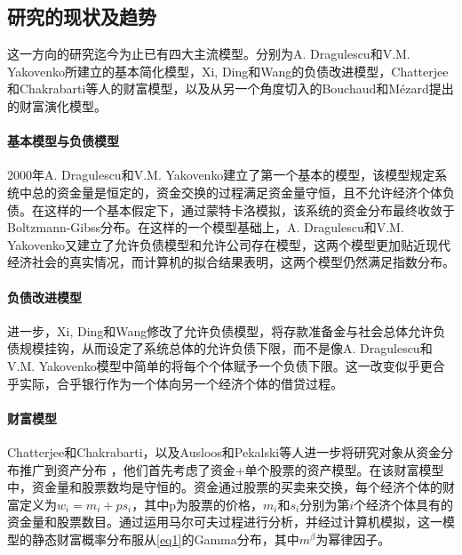 \documentclass[tsinghuacite]{HustGraduPaper}
\begin{document}
		
		\subsection{研究的现状及趋势}

			这一方向的研究迄今为止已有四大主流模型。分别为A. Dragulescu和V.M. Yakovenko所建立的基本简化模型，Xi, Ding和Wang的负债改进模型，Chatterjee和Chakrabarti等人的财富模型，以及从另一个角度切入的Bouchaud和Mézard提出的财富演化模型。
	
			\paragraph{基本模型与负债模型}
			
			2000年A. Dragulescu和V.M. Yakovenko建立了第一个基本的模型，该模型规定系统中总的资金量是恒定的，资金交换的过程满足资金量守恒，且不允许经济个体负债\cite{dragulescu2000statistical}。在这样的一个基本假定下，通过蒙特卡洛模拟，该系统的资金分布最终收敛于Boltzmann-Gibss分布。在这样的一个模型基础上，A. Dragulescu和V.M. Yakovenko又建立了允许负债模型和允许公司存在模型\cite{dragulescu2000statistical}，这两个模型更加贴近现代经济社会的真实情况，而计算机的拟合结果表明，这两个模型仍然满足指数分布。
	
			\paragraph{负债改进模型}
			
			进一步，Xi, Ding和Wang修改了允许负债模型，将存款准备金与社会总体允许负债规模挂钩，从而设定了系统总体的允许负债下限，而不是像A. Dragulescu和V.M. Yakovenko模型中简单的将每个个体赋予一个负债下限。这一改变似乎更合乎实际，合乎银行作为一个体向另一个经济个体的借贷过程。
	
			\paragraph{财富模型}
			
			Chatterjee和Chakrabarti，以及Ausloos和Pekalski等人进一步将研究对象从资金分布推广到资产分布\cite{chakraborti2001self} \cite{chatterjee2006kinetic} \cite{ausloos2007model}，他们首先考虑了资金+单个股票的资产模型。在该财富模型中，资金量和股票数均是守恒的。资金通过股票的买卖来交换，每个经济个体的财富定义为$w_i = m_i + p s_i$，其中p为股票的价格，$m_i$和$s_i$分别为第$i$个经济个体具有的资金量和股票数目。通过运用马尔可夫过程进行分析，并经过计算机模拟，这一模型的静态财富概率分布服从\eqref{eq1}的Gamma分布，其中$m^{\beta}$为幂律因子。
	
\end{document}
